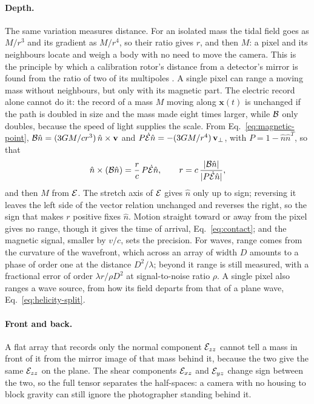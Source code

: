 \paragraph{Depth.} The same variation measures distance. For an isolated mass
the tidal field goes as $M/r^{3}$ and its gradient as $M/r^{4}$, so their
ratio gives $r$, and then $M$: a pixel and its neighbours locate and weigh a
body with no need to move the camera. This is the principle by which a
calibration rotor's distance from a detector's mirror is found from the ratio
of two of its multipoles \cite{Inoue2018}. A single pixel can range a moving
mass without neighbours, but only with its magnetic part. The electric record
alone cannot do it: the record of a mass $M$ moving along $\mathbf{x}(t)$ is
unchanged if the path is doubled in size and the mass made eight times larger,
while $\mathcal{B}$ only doubles, because the speed of light supplies the scale. From Eq.~\eqref{eq:magnetic-point}, $\mathcal{B}\hat n =
(3GM/cr^3)\,\hat n\times\mathbf v$ and $P\dot{\mathcal{E}}\hat n = -(3GM/r^4)\,\mathbf
v_\perp$, with $P = 1 - \hat n\hat n^{T}$, so that
\begin{equation}\label{eq:one-pixel-range}
\hat n\times(\mathcal{B}\hat n) = \frac{r}{c}\,P\dot{\mathcal{E}}\hat n ,
\qquad r = c\,\frac{|\mathcal{B}\hat n|}{|P\dot{\mathcal{E}}\hat n|} ,
\end{equation}
and then $M$ from $\mathcal{E}$. The stretch axis of $\mathcal{E}$ gives $\hat n$ only up to
sign; reversing it leaves the left side of the vector relation unchanged and
reverses the right, so the sign that makes $r$ positive fixes $\hat n$. Motion straight
toward or away from the pixel gives no range, though it gives the time of
arrival, Eq.~\eqref{eq:contact}; and the magnetic signal, smaller by $v/c$, sets
the precision. For waves, range comes from the curvature of the wavefront, which
across an array of width $D$ amounts to a phase of order one at the distance
$D^{2}/\lambda$; beyond it range is still measured, with a fractional error of
order $\lambda r/\rho D^{2}$ at signal-to-noise ratio $\rho$. A
single pixel also ranges a wave source, from how its field departs from that of
a plane wave, Eq.~\eqref{eq:helicity-split}.

\paragraph{Front and back.} A flat array that records only the normal
component $\mathcal{E}_{zz}$ cannot tell a mass in front of it from the mirror image of
that mass behind it, because the two give the same $\mathcal{E}_{zz}$ on the plane. The
shear components $\mathcal{E}_{xz}$ and $\mathcal{E}_{yz}$ change sign between the two, so the
full tensor separates the half-spaces: a camera with no housing to block
gravity can still ignore the photographer standing behind it.


